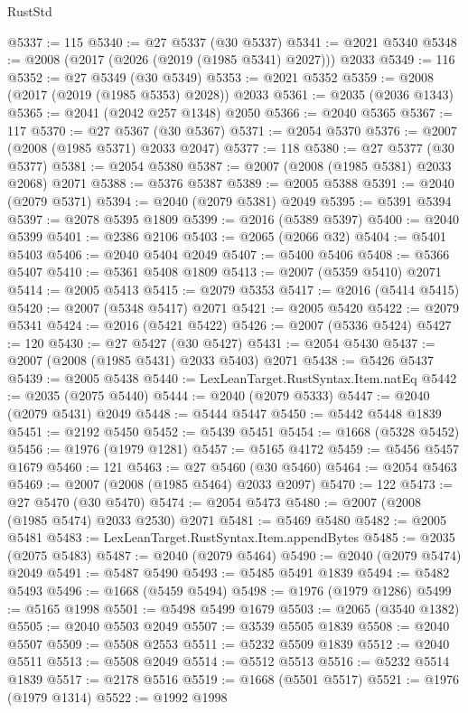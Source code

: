 \begin{lexlean}{RustStd}
\begin{coremodule}
@5337 := 115
@5340 := @27 @5337 (@30 @5337)
@5341 := @2021 @5340
@5348 := @2008 (@2017 (@2026 (@2019 (@1985 @5341) @2027))) @2033
@5349 := 116
@5352 := @27 @5349 (@30 @5349)
@5353 := @2021 @5352
@5359 := @2008 (@2017 (@2019 (@1985 @5353) @2028)) @2033
@5361 := @2035 (@2036 @1343)
@5365 := @2041 (@2042 @257 @1348) @2050
@5366 := @2040 @5365
@5367 := 117
@5370 := @27 @5367 (@30 @5367)
@5371 := @2054 @5370
@5376 := @2007 (@2008 (@1985 @5371) @2033 @2047)
@5377 := 118
@5380 := @27 @5377 (@30 @5377)
@5381 := @2054 @5380
@5387 := @2007 (@2008 (@1985 @5381) @2033 @2068) @2071
@5388 := @5376 @5387
@5389 := @2005 @5388
@5391 := @2040 (@2079 @5371)
@5394 := @2040 (@2079 @5381) @2049
@5395 := @5391 @5394
@5397 := @2078 @5395 @1809
@5399 := @2016 (@5389 @5397)
@5400 := @2040 @5399
@5401 := @2386 @2106
@5403 := @2065 (@2066 @32)
@5404 := @5401 @5403
@5406 := @2040 @5404 @2049
@5407 := @5400 @5406
@5408 := @5366 @5407
@5410 := @5361 @5408 @1809
@5413 := @2007 (@5359 @5410) @2071
@5414 := @2005 @5413
@5415 := @2079 @5353
@5417 := @2016 (@5414 @5415)
@5420 := @2007 (@5348 @5417) @2071
@5421 := @2005 @5420
@5422 := @2079 @5341
@5424 := @2016 (@5421 @5422)
@5426 := @2007 (@5336 @5424)
@5427 := 120
@5430 := @27 @5427 (@30 @5427)
@5431 := @2054 @5430
@5437 := @2007 (@2008 (@1985 @5431) @2033 @5403) @2071
@5438 := @5426 @5437
@5439 := @2005 @5438
@5440 := LexLeanTarget.RustSyntax.Item.natEq
@5442 := @2035 (@2075 @5440)
@5444 := @2040 (@2079 @5333)
@5447 := @2040 (@2079 @5431) @2049
@5448 := @5444 @5447
@5450 := @5442 @5448 @1839
@5451 := @2192 @5450
@5452 := @5439 @5451
@5454 := @1668 (@5328 @5452)
@5456 := @1976 (@1979 @1281)
@5457 := @5165 @4172
@5459 := @5456 @5457 @1679
@5460 := 121
@5463 := @27 @5460 (@30 @5460)
@5464 := @2054 @5463
@5469 := @2007 (@2008 (@1985 @5464) @2033 @2097)
@5470 := 122
@5473 := @27 @5470 (@30 @5470)
@5474 := @2054 @5473
@5480 := @2007 (@2008 (@1985 @5474) @2033 @2530) @2071
@5481 := @5469 @5480
@5482 := @2005 @5481
@5483 := LexLeanTarget.RustSyntax.Item.appendBytes
@5485 := @2035 (@2075 @5483)
@5487 := @2040 (@2079 @5464)
@5490 := @2040 (@2079 @5474) @2049
@5491 := @5487 @5490
@5493 := @5485 @5491 @1839
@5494 := @5482 @5493
@5496 := @1668 (@5459 @5494)
@5498 := @1976 (@1979 @1286)
@5499 := @5165 @1998
@5501 := @5498 @5499 @1679
@5503 := @2065 (@3540 @1382)
@5505 := @2040 @5503 @2049
@5507 := @3539 @5505 @1839
@5508 := @2040 @5507
@5509 := @5508 @2553
@5511 := @5232 @5509 @1839
@5512 := @2040 @5511
@5513 := @5508 @2049
@5514 := @5512 @5513
@5516 := @5232 @5514 @1839
@5517 := @2178 @5516
@5519 := @1668 (@5501 @5517)
@5521 := @1976 (@1979 @1314)
@5522 := @1992 @1998

\end{coremodule}
\end{lexlean}
